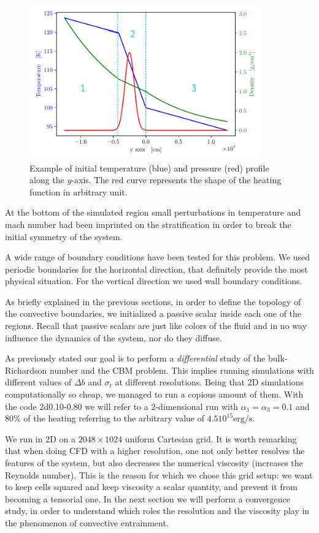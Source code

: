 \begin{figure}[t]
\centering
\includegraphics[width=10cm]{./img/twin.pdf}
\caption{Example of initial temperature (blue) and pressure (red) profile along the $y$-axis. The red curve represents the shape of the heating function in arbitrary unit.}
\label{fig:twin}
\centering
\end{figure}
At the bottom of the simulated region small perturbations in temperature and mach number had been imprinted on the stratification in order to break the initial symmetry of the system.

A wide range of boundary conditions have been tested for this problem. We used periodic boundaries for the horizontal direction, that definitely provide the most physical situation. For the vertical direction we used wall boundary conditions.

As briefly explained in the previous sections, in order to define the topology of the convective boundaries, we initialized a passive scalar inside each one of the regions. Recall that passive scalars are just like colors of the fluid and in no way influence the dynamics of the system, nor do they diffuse.

As previously stated our goal is to perform a \textit{differential} study of the bulk-Richardson number and the CBM problem. This implies running simulations with different values of $\Delta b$ and $\sigma_t$ at different resolutions. Being that 2D simulations computationally so cheap, we managed to run a copious amount of them. With the code 2d0.10-0.80 we will refer to a 2-dimensional run with $\alpha_{1} = \alpha_{3}=0.1$ and $80 \%$ of the heating referring to the arbitrary value of $4.5 10^{15} \mathrm{erg/s}$.

We run in 2D on a $2048 \times 1024$ uniform Cartesian grid. It is worth remarking that when doing CFD with a higher resolution, one not only better resolves the features of the system, but also decreases the numerical viscosity (increases the Reynolds number). This is the reason for which we chose this grid setup: we want to keep cells squared and keep viscosity a scalar quantity, and prevent it from becoming a tensorial one. In the next section we will perform a convergence study, in order to understand which roles the resolution and the viscosity play in the phenomenon of convective entrainment.


